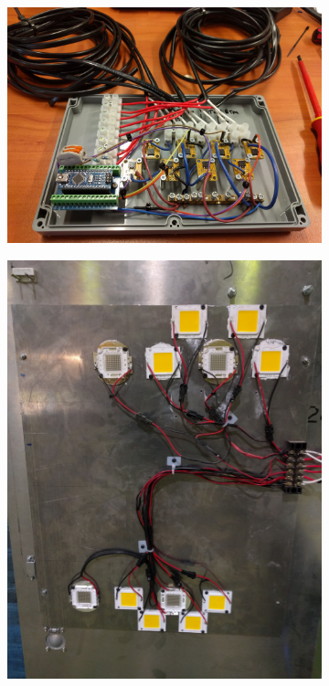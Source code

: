 \documentclass[fleqn,twoside]{article}
\begin{document}
\begin{figure}[h]
	\centering
	\begin{subfigure}{0.4\textwidth}
		\centering
		\includegraphics[width=0.9\linewidth]{mosfet_arduino.jpg}
		\caption{}
		\label{fig:mosfet_arduino}
	\end{subfigure}%
	\begin{subfigure}{0.25\textwidth}
		\centering
		\includegraphics[width=0.8\linewidth]{LED_door_1.jpg}
		\caption{}

\end{subfigure}
\end{figure}
\end{document}
